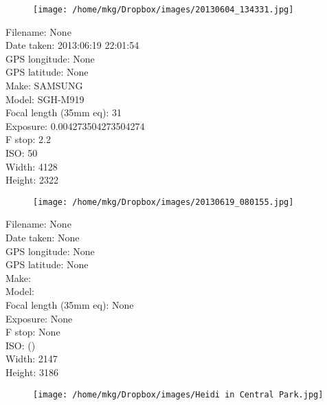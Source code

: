 \clearpage
\recalctypearea
\newpage
\noindent
\begin{figure}
    \texttt{[image: /home/mkg/Dropbox/images/20130604\_134331.jpg]}
\end{figure}

\clearpage
\recalctypearea
\newpage
\noindent
Filename: None\\ 
Date taken: 2013:06:19 22:01:54\\ 
GPS longitude: None\\ 
GPS latitude: None\\ 
Make: SAMSUNG\\ 
Model: SGH-M919\\ 
Focal length (35mm eq): 31\\ 
Exposure: 0.004273504273504274\\ 
F stop: 2.2\\ 
ISO: 50\\ 
Width: 4128\\ 
Height: 2322\\ 

\clearpage
\recalctypearea
\newpage
\noindent
\begin{figure}
    \texttt{[image: /home/mkg/Dropbox/images/20130619\_080155.jpg]}
\end{figure}

\clearpage
\recalctypearea
\newpage
\noindent
Filename: None\\ 
Date taken: None\\ 
GPS longitude: None\\ 
GPS latitude: None\\ 
Make: \\ 
Model: \\ 
Focal length (35mm eq): None\\ 
Exposure: None\\ 
F stop: None\\ 
ISO: ()\\ 
Width: 2147\\ 
Height: 3186\\ 

\clearpage
\recalctypearea
\newpage
\noindent
\begin{figure}
    \texttt{[image: /home/mkg/Dropbox/images/Heidi in Central Park.jpg]}
\end{figure}

